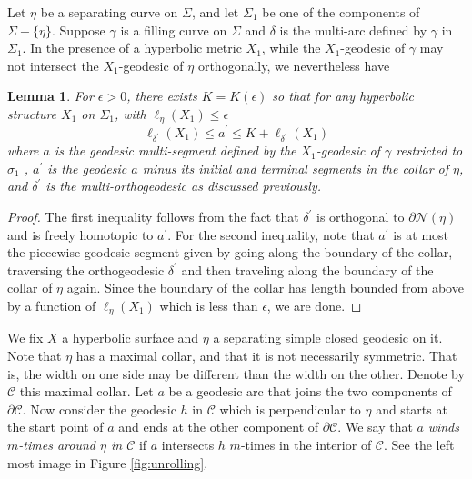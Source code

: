 \documentclass[12pt]{amsart}
\numberwithin{equation}{section}
\theoremstyle{plain}
\newtheorem{lem}[thm]{Lemma}
\begin{document}
Let $\eta$ be a separating curve on $\Sigma$, and let 
$\Sigma_1$ be one of the components of $\Sigma-\{\eta\}$.  
Suppose $\gamma$ is a filling curve on $\Sigma$ and $\delta$ is the multi-arc defined by $\gamma$ in $\Sigma_{1}$. In the presence of a hyperbolic metric $X_1$, while the $X_1$-geodesic of $\gamma$ may not 
intersect the $X_1$-geodesic of $\eta$ orthogonally, we nevertheless have

\begin{lem} For $\epsilon>0$, there exists $K=K(\epsilon)$ so that for any hyperbolic structure $X_1$ on $\Sigma_1$, 
with  $\ell_{\eta}(X_1) \leq \epsilon$
\begin{displaymath}
 \ell_{\delta^{\prime}}(X_1) \leq a^{\prime}   \leq  K+ \ell_{\delta^{\prime}}(X_1)
\end{displaymath}
where $a$ is the geodesic multi-segment defined by the 
$X_1$-geodesic of $\gamma$ restricted to $\sigma_1$ , $a^{\prime}$ is the geodesic  $a$  minus its initial and terminal segments in  the collar of $\eta$, and 
$\delta^{\prime}$ is the multi-orthogeodesic as discussed previously. 
\end{lem}

\begin{proof} The first inequality follows from the fact that $\delta^{\prime}$
is orthogonal to $\partial \mathcal{N}(\eta)$ and is freely homotopic to 
$a^{\prime}$. For the second inequality, note that $a^{\prime}$  is at most the piecewise geodesic segment given by going along the boundary of the collar, traversing the orthogeodesic $\delta^{\prime}$ and then traveling along the boundary of the collar of 
$\eta$ again. Since the boundary of the collar has length bounded from above by a function of $\ell_{\eta}(X_1)$ which is less than $\epsilon$, we are done. 

\end{proof}



 We fix  $X$  a hyperbolic surface and $\eta$ a separating simple closed geodesic on it.  Note that $\eta$ has a maximal collar, and that it is not necessarily symmetric. That is,
the width on one side may be different than the width on the other.  Denote by
 $\mathcal{C}$ this maximal collar. Let $a$ be a geodesic arc that joins the two components of $\partial \mathcal{C}$.  Now consider the geodesic  $h$ in  $\mathcal{C}$ which is perpendicular to $\eta$ and starts at the start point of $a$ and ends at the other component of  $\partial \mathcal{C}$.  We say that $a$ {\it winds  $m$-times  around $\eta$ in $\mathcal{C}$}  if  $a$ intersects $h$ 
$m$-times in the interior of $\mathcal{C}$. See the left most image in Figure \ref{fig:unrolling}.
 
\end{document}
